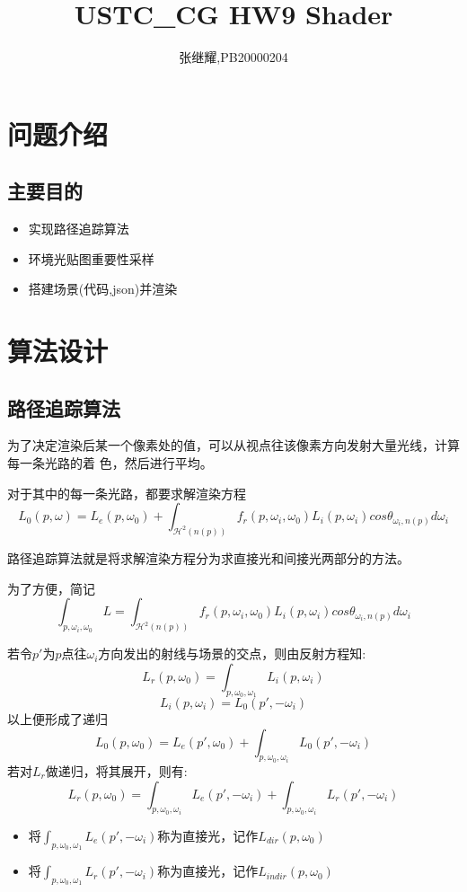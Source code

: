 \documentclass{article}
\title{USTC\_CG HW9 Shader}
\author{张继耀,PB20000204}
\begin{document}
	\maketitle
	
	\tableofcontents
	
	\section {问题介绍}
	\subsection{主要目的}
	\begin{itemize}
		\item 实现路径追踪算法
	\end{itemize}
	
	\begin{itemize}
		\item 环境光贴图重要性采样
	\end{itemize}
	
	\begin{itemize}
		\item 搭建场景(代码,json)并渲染
	\end{itemize}
	
	
	\section{算法设计}
	
	\subsection{路径追踪算法}
	为了决定渲染后某一个像素处的值，可以从视点往该像素方向发射大量光线，计算每一条光路的着
	色，然后进行平均。
	
	对于其中的每一条光路，都要求解渲染方程
	$$ L_0(p,\omega) = L_e(p,\omega_0)+\int_{\mathcal{H}^2(n(p))}f_r(p,\omega_i,\omega_0)L_i(p,\omega_i)cos\theta_{\omega_i,n(p)}d\omega_i  $$
	
	路径追踪算法就是将求解渲染方程分为求直接光和间接光两部分的方法。
	
	为了方便，简记$$ \int_{p,\omega_i,\omega_0}L = \int_{\mathcal{H}^2(n(p))}f_r(p,\omega_i,\omega_0)L_i(p,\omega_i)cos\theta_{\omega_i,n(p)}d\omega_i$$
	
	若令$p'$为$p$点往$\omega_i$方向发出的射线与场景的交点，则由反射方程知:
	$$ L_r(p,\omega_0) = \int_{p,\omega_0,\omega_1}L_i(p,\omega_i) $$
	  $$ L_i(p,\omega_i) = L_0(p',-\omega_i) $$
	  以上便形成了递归
	  $$ L_0(p,\omega_0) = L_e(p',\omega_0) + \int_{p,\omega_0,\omega_i}L_0(p',-\omega_i) $$
	  若对$L_r$做递归，将其展开，则有:
	    $$ L_r(p,\omega_0) = \int_{p,\omega_0,\omega_i}L_e(p',-\omega_i) + \int_{p,\omega_0,\omega_i}L_r(p',-\omega_i) $$
	\begin{itemize}
		\item 将$\int_{p,\omega_0,\omega_1}L_e(p',-\omega_i)$称为直接光，记作$L_{dir}(p,\omega_0)$
	\end{itemize}
  \begin{itemize}
	\item 将$\int_{p,\omega_0,\omega_1}L_r(p',-\omega_i)$称为直接光，记作$L_{indir}(p,\omega_0)$
  \end{itemize}    
	
\end{document}
